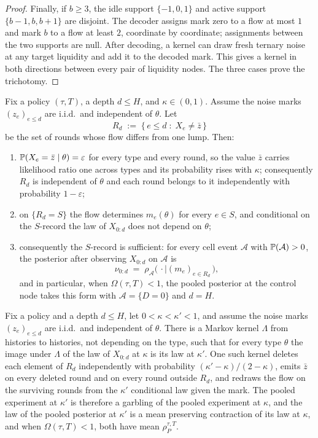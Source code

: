 \begin{proof}
Finally, if $b \geq 3$, the idle support $\{-1,0,1\}$ and active support
$\{b-1,b,b+1\}$ are disjoint. The decoder assigns mark zero to a flow at most $1$ and mark
$b$ to a flow at least $2$, coordinate by coordinate; assignments between the two supports are
null. After decoding, a kernel can draw fresh
ternary noise at any target liquidity and add it to the decoded mark. This gives a kernel in both
directions between every pair of liquidity nodes. The three cases prove the trichotomy.
\end{proof}

\begin{lemma}
\label{lem:g1}
Fix a policy $(\tau,T)$, a depth $d \le H$, and $\kappa \in (0,1)$. Assume the noise marks
$(z_e)_{e \le d}$ are i.i.d.\ and independent of $\theta$. Let
\[
R_d \;:=\; \{\, e \le d \;:\; X_e \neq \bar z \,\}
\]
be the set of rounds whose flow differs from one lump. Then:
\begin{enumerate}[label=(\alph*),leftmargin=2.4em,itemsep=3pt]
\item $\mathbb{P}(X_e = \bar z \mid \theta) = \varepsilon$ for every type and every round, so the value
  $\bar z$ carries likelihood ratio one across types and its probability rises with $\kappa$;
  consequently $R_d$ is independent of $\theta$ and each round belongs to it independently with
  probability $1-\varepsilon$;
\item on $\{R_d = S\}$ the flow determines $m_e(\theta)$ for every $e \in S$, and conditional on
  the $S$-record the law of $X_{0:d}$ does not depend on $\theta$;
\item consequently the $S$-record is sufficient: for every cell event $\mathcal A$ with
  $\mathbb{P}(\mathcal A) > 0$, the posterior after observing $X_{0:d}$ on $\mathcal A$ is
  \[
  \nu_{0:d} \;=\; \rho_{\mathcal A}\bigl(\,\cdot \mid (m_e)_{e \in R_d}\,\bigr),
  \]
  and in particular, when $\Omega(\tau,T) < 1$, the pooled posterior at the control node takes
  this form with $\mathcal A = \{D=0\}$ and $d = H$.
\end{enumerate}
\end{lemma}

\begin{lemma}
\label{lem:g2}
Fix a policy and a depth $d \le H$, let $0 < \kappa < \kappa' < 1$, and assume the noise marks
$(z_e)_{e \le d}$ are i.i.d.\ and independent of $\theta$. There is a Markov kernel
$\Lambda$ from histories to histories, not depending on the type, such that for every type
$\theta$ the image under $\Lambda$ of the law of $X_{0:d}$ at $\kappa$ is its law at $\kappa'$.
One such kernel deletes each element of $R_d$ independently with probability
$(\kappa'-\kappa)/(2-\kappa)$, emits $\bar z$ on every deleted round and on every round outside
$R_d$, and redraws the flow on the surviving rounds from the $\kappa'$ conditional law given the
mark. The pooled experiment at $\kappa'$ is therefore a garbling of the pooled experiment at
$\kappa$, and the law of the pooled posterior at $\kappa'$ is a mean preserving contraction of
its law at $\kappa$, and when $\Omega(\tau,T) < 1$, both have mean $\rho_P^{\tau,T}$.
\end{lemma}

